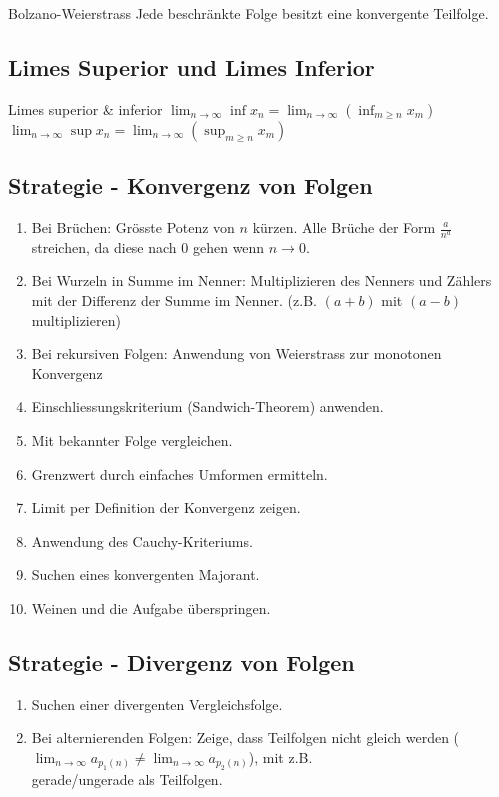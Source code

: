 \documentclass[a4paper,8pt]{extarticle}
\def\limn{\lim_{n\to \infty}}
\begin{document}
\begin{mainbox}{Bolzano-Weierstrass}
  Jede beschränkte Folge besitzt eine konvergente Teilfolge.
\end{mainbox}

\subsection{Limes Superior und Limes Inferior}
\begin{subbox}{Limes superior \& inferior}
  $\limn \inf x_n = \limn \left( \inf_{m \ge n} x_m \right)$ \\
  $\limn \sup x_n = \limn \left( \sup_{m \ge n} x_m \right)$
\end{subbox}

\subsection{Strategie - Konvergenz von Folgen}
\begin{enumerate}
 \item Bei Brüchen: Grösste Potenz von $n$ kürzen. Alle Brüche der Form $\frac{a}{n^a}$ streichen, da diese nach 0 gehen wenn $n \rightarrow 0$.
 \item Bei Wurzeln in Summe im Nenner: Multiplizieren des Nenners und Zählers mit der Differenz der Summe im Nenner. (z.B. $(a+b)$ mit $(a-b)$ multiplizieren)
 \item Bei rekursiven Folgen: Anwendung von Weierstrass zur monotonen Konvergenz
 \item Einschliessungskriterium (Sandwich-Theorem) anwenden.
 \item Mit bekannter Folge vergleichen.
 \item Grenzwert durch einfaches Umformen ermitteln.
 \item Limit per Definition der Konvergenz zeigen.
 \item Anwendung des Cauchy-Kriteriums.
 \item Suchen eines konvergenten Majorant.
 \item Weinen und die Aufgabe überspringen.
\end{enumerate}

\subsection{Strategie - Divergenz von Folgen}
\begin{enumerate}
 \item Suchen einer divergenten Vergleichsfolge.
 \item Bei alternierenden Folgen: Zeige, dass Teilfolgen nicht gleich werden ($\limn a_{p_1(n)} \ne \limn a_{p_2(n)}$), mit z.B. \\ gerade/ungerade als Teilfolgen.
\end{enumerate}
\end{document}
